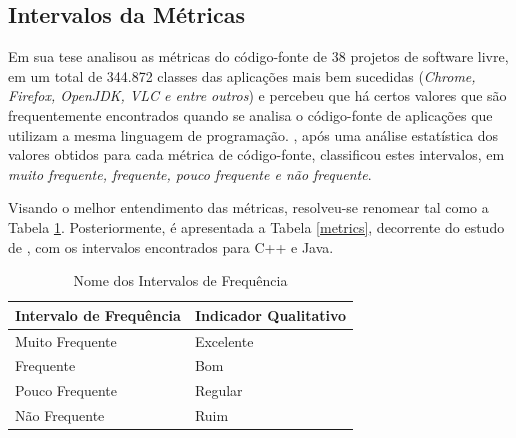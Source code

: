 \subsection{Intervalos da Métricas}
\label{Intervalos das Métricas}
Em sua tese  analisou as métricas do código-fonte de 
38 projetos de software livre, em um total de 344.872 classes das aplicações 
mais bem sucedidas (\textit{Chrome, Firefox, OpenJDK, VLC e entre outros}) e 
percebeu que há certos valores que são frequentemente encontrados quando se 
analisa o código-fonte de aplicações que utilizam a mesma linguagem de 
programação. , após uma análise estatística dos 
valores obtidos para cada métrica de código-fonte, classificou estes 
intervalos, em \textit{muito frequente, frequente, pouco frequente e não 
frequente}. 

Visando o melhor entendimento das métricas, resolveu-se renomear tal como a 
Tabela \ref{nomes}. Posteriormente, é apresentada a Tabela \ref{metrics}, 
decorrente do estudo de , com os intervalos 
encontrados para C++ e Java.

	\begin{table}[!ht]
	\begin{center}
	 \begin{tabular}{|l|l|}
		\hline
		Intervalo de Frequência & Indicador Qualitativo \\ \hline
		Muito Frequente & Excelente \\ \hline
		Frequente       & Bom       \\ \hline
		Pouco Frequente & Regular   \\ \hline
		Não Frequente   & Ruim      \\ \hline
		\end{tabular}
		\caption{Nome dos Intervalos de Frequência}
		\label{nomes}
		\end{center}
		\end{table}
		
\FloatBarrier
	
